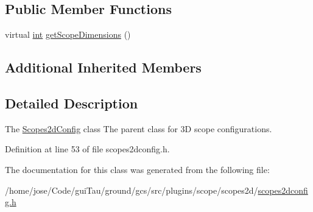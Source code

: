 \subsection*{Public Member Functions}
\begin{DoxyCompactItemize}
\item 
virtual \hyperlink{ioapi_8h_a787fa3cf048117ba7123753c1e74fcd6}{int} \hyperlink{group___scope_plugin_ga95a6bd24b6f73fad855102d785678676}{get\-Scope\-Dimensions} ()
\end{DoxyCompactItemize}
\subsection*{Additional Inherited Members}


\subsection{Detailed Description}
The \hyperlink{class_scopes2d_config}{Scopes2d\-Config} class The parent class for 3\-D scope configurations. 

Definition at line 53 of file scopes2dconfig.\-h.



The documentation for this class was generated from the following file\-:\begin{DoxyCompactItemize}
\item 
/home/jose/\-Code/gui\-Tau/ground/gcs/src/plugins/scope/scopes2d/\hyperlink{scopes2dconfig_8h}{scopes2dconfig.\-h}\end{DoxyCompactItemize}

